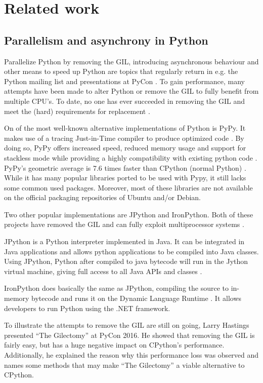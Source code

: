 \chapter{Related work}
\label{cpt:related_work}

\section{Parallelism and asynchrony in Python}
\label{sct:parallelism_and_asynchrony_in_python}
Parallelize Python by removing the GIL, introducing asynchronous behaviour and other means to speed up Python are topics that regularly return in e.g. the Python mailing list and presentations at PyCon \cite{python2015global}.
To gain performance, many attempts have been made to alter Python or remove the GIL to fully benefit from multiple CPU's.
To date, no one has ever succeeded in removing the GIL and meet the (hard) requirements for replacement \cite{python2015global}.

On of the most well-known alternative implementations of Python is PyPy.
It makes use of a tracing Just-in-Time compiler to produce optimized code \cite{bolz2009tracing}.
By doing so, PyPy offers increased speed, reduced memory usage and support for stackless mode while providing a highly compatibility with existing python code \cite{pypy2016pypy}.
PyPy's geometric average is 7.6 times faster than CPython (normal Python) \cite{pypy2016speed}.
While it has many popular libraries ported to be used with Pypy, it still lacks some common used packages.
Moreover, most of these libraries are not available on the official packaging repositories of Ubuntu and/or Debian.

Two other popular implementations are JPython and IronPython.
Both of these projects have removed the GIL and can fully exploit multiprocessor systems \cite{python2015global}.

JPython is a Python interpreter implemented in Java. It can be integrated in Java applications and allows python applications to be compiled into Java classes.
Using JPython, Python after compiled to java bytecode will run in the Jython virtual machine, giving full access to all Java APIs and classes \cite{jython2016why}.

IronPython does basically the same as JPython, compiling the source to in-memory bytecode and runs it on the Dynamic Language Runtime \cite{ironpython2014}.
It allows developers to run Python using the .NET framework.

To illustrate the attempts to remove the GIL are still on going, Larry Hastings presented ``The Gilectomy'' at PyCon 2016.
He showed that removing the GIL is fairly easy, but has a huge negative impact on CPython's performance.
Additionally, he explained the reason why this performance loss was observed and names some methods that may make ``The Gilectomy'' a viable alternative to CPython.\\

